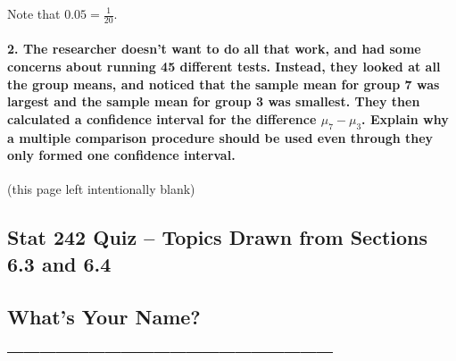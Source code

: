 \documentclass[]{article}
\let\oldparagraph\paragraph
\renewcommand{\paragraph}[1]{\oldparagraph{#1}\mbox{}}
\begin{document}
Note that \(0.05 = \frac{1}{20}\).

\vspace{5cm}

\paragraph{\texorpdfstring{2. The researcher doesn't want to do all that
work, and had some concerns about running 45 different tests. Instead,
they looked at all the group means, and noticed that the sample mean for
group 7 was largest and the sample mean for group 3 was smallest. They
then calculated a confidence interval for the difference
\(\mu_7 - \mu_3\). Explain why a multiple comparison procedure should be
used even through they only formed one confidence
interval.}{2. The researcher doesn't want to do all that work, and had some concerns about running 45 different tests. Instead, they looked at all the group means, and noticed that the sample mean for group 7 was largest and the sample mean for group 3 was smallest. They then calculated a confidence interval for the difference \textbackslash{}mu\_7 - \textbackslash{}mu\_3. Explain why a multiple comparison procedure should be used even through they only formed one confidence interval.}}\label{the-researcher-doesnt-want-to-do-all-that-work-and-had-some-concerns-about-running-45-different-tests.-instead-they-looked-at-all-the-group-means-and-noticed-that-the-sample-mean-for-group-7-was-largest-and-the-sample-mean-for-group-3-was-smallest.-they-then-calculated-a-confidence-interval-for-the-difference-mu_7---mu_3.-explain-why-a-multiple-comparison-procedure-should-be-used-even-through-they-only-formed-one-confidence-interval.}

\newpage

(this page left intentionally blank)

\newpage

\subsection{Stat 242 Quiz -- Topics Drawn from Sections 6.3 and
6.4}\label{stat-242-quiz-topics-drawn-from-sections-6.3-and-6.4-1}

\subsection{What's Your Name?
\_\_\_\_\_\_\_\_\_\_\_\_\_\_\_\_\_\_\_\_}\label{whats-your-name-____________________-1}
\end{document}
